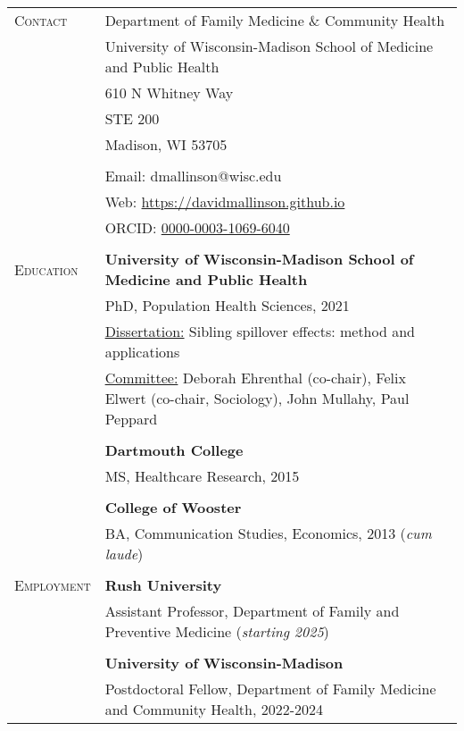 \documentclass[letterpaper,10pt,oneside]{article}
\begin{document}
\begin{longtable}{@{} p{} p{}}
\textsc{Contact}   & Department of Family Medicine \& Community Health\\
     & University of Wisconsin-Madison School of Medicine and Public Health \\
     & 610 N Whitney Way \\
     & STE 200 \\
     & Madison, WI 53705 \\
     & \\
     & Email: dmallinson@wisc.edu \\
     & Web: \href{https://davidmallinson.github.io}{https://davidmallinson.github.io} \\
     & ORCID: \href{https://orcid.org/0000-0003-1069-6040/}{0000-0003-1069-6040} \\
     & \\
\textsc{Education}    & \textbf{University of Wisconsin-Madison School of Medicine and Public Health} \\
     & PhD, Population Health Sciences, 2021 \\
     & \parbox{6.15in}{\underline{Dissertation:} Sibling spillover effects: method and applications} \\
     & \parbox{6.15in}{\underline{Committee:} Deborah Ehrenthal (co-chair), Felix Elwert (co-chair, Sociology), John Mullahy, Paul Peppard} \\
     & \\
     & \textbf{Dartmouth College} \\
     & MS, Healthcare Research, 2015 \\
     & \\
     & \textbf{College of Wooster} \\
     & BA, Communication Studies, Economics, 2013 (\textit{cum laude}) \\
     & \\
\textsc{Employment} & \textbf{Rush University} \\
     & Assistant Professor, Department of Family and Preventive Medicine (\textit{starting 2025}) \\
     & \\
     & \textbf{University of Wisconsin-Madison} \\
     & Postdoctoral Fellow, Department of Family Medicine and Community Health, 2022-2024 \\

\end{longtable}
\end{document}
